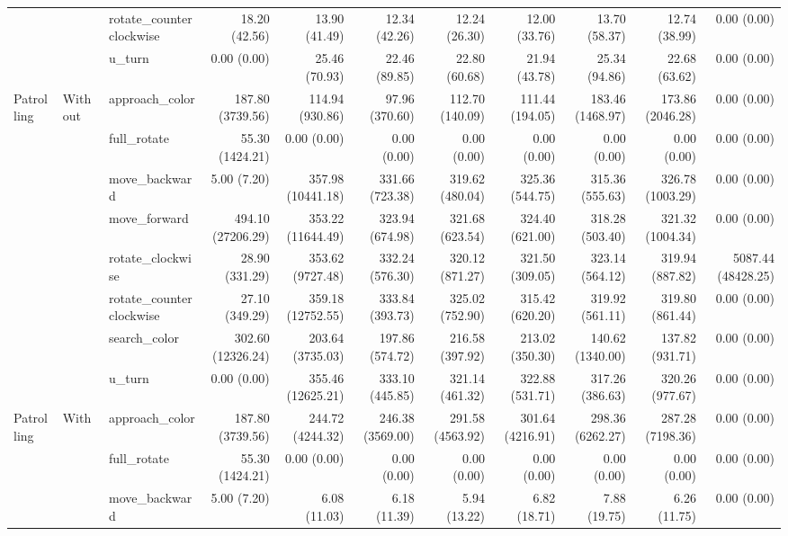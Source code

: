 \begin{table}[t]
{\begin{tabular}{lllrrrrrrrr}
 &  & rotate\_counterclockwise & 18.20 (42.56) & 13.90 (41.49) & 12.34 (42.26) & 12.24 (26.30) & 12.00 (33.76) & 13.70 (58.37) & 12.74 (38.99) & 0.00 (0.00) \\
 &  & u\_turn & 0.00 (0.00) & 25.46 (70.93) & 22.46 (89.85) & 22.80 (60.68) & 21.94 (43.78) & 25.34 (94.86) & 22.68 (63.62) & 0.00 (0.00) \\
\hline
Patrolling & Without & approach\_color & 187.80 (3739.56) & 114.94 (930.86) & 97.96 (370.60) & 112.70 (140.09) & 111.44 (194.05) & 183.46 (1468.97) & 173.86 (2046.28) & 0.00 (0.00) \\
 &  & full\_rotate & 55.30 (1424.21) & 0.00 (0.00) & 0.00 (0.00) & 0.00 (0.00) & 0.00 (0.00) & 0.00 (0.00) & 0.00 (0.00) & 0.00 (0.00) \\
 &  & move\_backward & 5.00 (7.20) & 357.98 (10441.18) & 331.66 (723.38) & 319.62 (480.04) & 325.36 (544.75) & 315.36 (555.63) & 326.78 (1003.29) & 0.00 (0.00) \\
 &  & move\_forward & 494.10 (27206.29) & 353.22 (11644.49) & 323.94 (674.98) & 321.68 (623.54) & 324.40 (621.00) & 318.28 (503.40) & 321.32 (1004.34) & 0.00 (0.00) \\
 &  & rotate\_clockwise & 28.90 (331.29) & 353.62 (9727.48) & 332.24 (576.30) & 320.12 (871.27) & 321.50 (309.05) & 323.14 (564.12) & 319.94 (887.82) & 5087.44 (48428.25) \\
 &  & rotate\_counterclockwise & 27.10 (349.29) & 359.18 (12752.55) & 333.84 (393.73) & 325.02 (752.90) & 315.42 (620.20) & 319.92 (561.11) & 319.80 (861.44) & 0.00 (0.00) \\
 &  & search\_color & 302.60 (12326.24) & 203.64 (3735.03) & 197.86 (574.72) & 216.58 (397.92) & 213.02 (350.30) & 140.62 (1340.00) & 137.82 (931.71) & 0.00 (0.00) \\
 &  & u\_turn & 0.00 (0.00) & 355.46 (12625.21) & 333.10 (445.85) & 321.14 (461.32) & 322.88 (531.71) & 317.26 (386.63) & 320.26 (977.67) & 0.00 (0.00) \\
Patrolling & With & approach\_color & 187.80 (3739.56) & 244.72 (4244.32) & 246.38 (3569.00) & 291.58 (4563.92) & 301.64 (4216.91) & 298.36 (6262.27) & 287.28 (7198.36) & 0.00 (0.00) \\
 &  & full\_rotate & 55.30 (1424.21) & 0.00 (0.00) & 0.00 (0.00) & 0.00 (0.00) & 0.00 (0.00) & 0.00 (0.00) & 0.00 (0.00) & 0.00 (0.00) \\
 &  & move\_backward & 5.00 (7.20) & 6.08 (11.03) & 6.18 (11.39) & 5.94 (13.22) & 6.82 (18.71) & 7.88 (19.75) & 6.26 (11.75) & 0.00 (0.00) \\

\end{tabular}}
\end{table}
